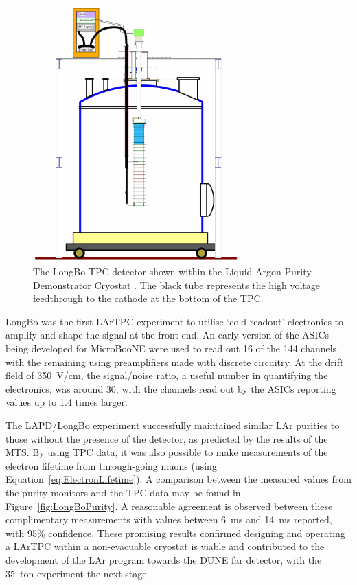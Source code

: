 \begin{figure}
  \centering
  \includegraphics[width=8cm]{LongBo.pdf}
  \caption[The LongBo TPC detector shown within the Liquid Argon Purity Demonstrator Cryostat.]{The LongBo TPC detector shown within the Liquid Argon Purity Demonstrator Cryostat \cite{LongBo2015}.  The black tube represents the high voltage feedthrough to the cathode at the bottom of the TPC.}
  \label{fig:LongBo}
\end{figure}

LongBo was the first LArTPC experiment to utilise `cold readout' electronics to amplify and shape the signal at the front end.  An early version of the ASICs being developed for MicroBooNE were used to read out 16 of the 144 channels, with the remaining using preamplifiers made with discrete circuitry.  At the drift field of 350~V/cm, the signal/noise ratio, a useful number in quantifying the electronics, was around 30, with the channels read out by the ASICs reporting values up to 1.4 times larger.

The LAPD/LongBo experiment successfully maintained similar LAr purities to those without the presence of the detector, as predicted by the results of the MTS.  By using TPC data, it was also possible to make measurements of the electron lifetime from through-going muons (using Equation~\ref{eq:ElectronLifetime}).  A comparison between the measured values from the purity monitors and the TPC data may be found in Figure~\ref{fig:LongBoPurity}.  A reasonable agreement is observed between these complimentary measurements with values between 6~ms and 14~ms reported, with 95\% confidence.  These promising results confirmed designing and operating a LArTPC within a non-evacuable cryostat is viable and contributed to the development of the LAr program towards the DUNE far detector, with the 35~ton experiment the next stage.

